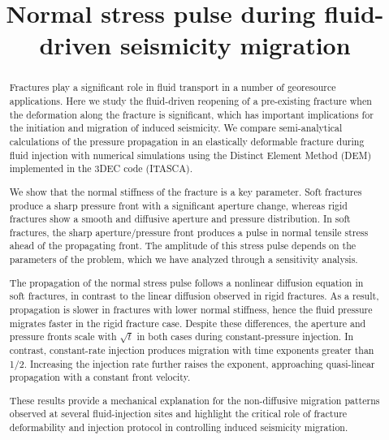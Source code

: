 \documentclass[draft]{agujournal2019}
\begin{document}
\title{Normal stress pulse during fluid-driven seismicity migration}

\correspondingauthor{}{}

\begin{keypoints}
	\item
	\item
	\item
\end{keypoints}

\begin{abstract}
	Fractures play a significant role in fluid transport in a number of georesource applications. Here we study the fluid-driven reopening of a pre-existing fracture when the deformation along the fracture is significant, which has important implications for the initiation and migration of induced seismicity. We compare semi-analytical calculations of the pressure propagation in an elastically deformable fracture during fluid injection with numerical simulations using the Distinct Element Method (DEM) implemented in the 3DEC code (ITASCA).

	We show that the normal stiffness of the fracture is a key parameter. Soft fractures produce a sharp pressure front with a significant aperture change, whereas rigid fractures show a smooth and diffusive aperture and pressure distribution. In soft fractures, the sharp aperture/pressure front produces a pulse in normal tensile stress ahead of the propagating front. The amplitude of this stress pulse depends on the parameters of the problem, which we have analyzed through a sensitivity analysis.

	The propagation of the normal stress pulse follows a nonlinear diffusion equation in soft fractures, in contrast to the linear diffusion observed in rigid fractures. As a result, propagation is slower in fractures with lower normal stiffness, hence the fluid pressure migrates faster in the rigid fracture case. Despite these differences, the aperture and pressure fronts scale with $\sqrt{t}$ in both cases during constant-pressure injection.  In contrast, constant-rate injection produces migration with time exponents greater than 1/2. Increasing the injection rate further raises the exponent, approaching quasi-linear propagation with a constant front velocity.

	These results provide a mechanical explanation for the non-diffusive migration patterns observed at several fluid-injection sites and highlight the critical role of fracture deformability and injection protocol in controlling induced seismicity migration.

\end{abstract}
\end{document}
